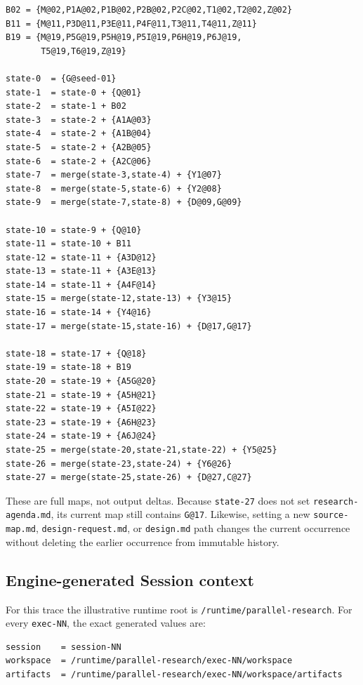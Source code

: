 \documentclass[11pt]{article}
\newcommand{\artifact}[1]{\texttt{#1}}
\begin{document}
\begin{lstlisting}[style=playbook,basicstyle=\ttfamily\scriptsize]
B02 = {M@02,P1A@02,P1B@02,P2B@02,P2C@02,T1@02,T2@02,Z@02}
B11 = {M@11,P3D@11,P3E@11,P4F@11,T3@11,T4@11,Z@11}
B19 = {M@19,P5G@19,P5H@19,P5I@19,P6H@19,P6J@19,
       T5@19,T6@19,Z@19}

state-0  = {G@seed-01}
state-1  = state-0 + {Q@01}
state-2  = state-1 + B02
state-3  = state-2 + {A1A@03}
state-4  = state-2 + {A1B@04}
state-5  = state-2 + {A2B@05}
state-6  = state-2 + {A2C@06}
state-7  = merge(state-3,state-4) + {Y1@07}
state-8  = merge(state-5,state-6) + {Y2@08}
state-9  = merge(state-7,state-8) + {D@09,G@09}

state-10 = state-9 + {Q@10}
state-11 = state-10 + B11
state-12 = state-11 + {A3D@12}
state-13 = state-11 + {A3E@13}
state-14 = state-11 + {A4F@14}
state-15 = merge(state-12,state-13) + {Y3@15}
state-16 = state-14 + {Y4@16}
state-17 = merge(state-15,state-16) + {D@17,G@17}

state-18 = state-17 + {Q@18}
state-19 = state-18 + B19
state-20 = state-19 + {A5G@20}
state-21 = state-19 + {A5H@21}
state-22 = state-19 + {A5I@22}
state-23 = state-19 + {A6H@23}
state-24 = state-19 + {A6J@24}
state-25 = merge(state-20,state-21,state-22) + {Y5@25}
state-26 = merge(state-23,state-24) + {Y6@26}
state-27 = merge(state-25,state-26) + {D@27,C@27}
\end{lstlisting}

These are full maps, not output deltas. Because \texttt{state-27} does not set
\artifact{research-agenda.md}, its current map still contains \texttt{G@17}.
Likewise, setting a new \artifact{source-map.md}, \artifact{design-request.md},
or \artifact{design.md} path changes the current occurrence without deleting
the earlier occurrence from immutable history.

\subsection{Engine-generated Session context}

For this trace the illustrative runtime root is
\texttt{/runtime/parallel-research}. For every \texttt{exec-NN}, the exact
generated values are:

\begin{lstlisting}[style=playbook]
session    = session-NN
workspace  = /runtime/parallel-research/exec-NN/workspace
artifacts  = /runtime/parallel-research/exec-NN/workspace/artifacts
\end{lstlisting}
\end{document}
